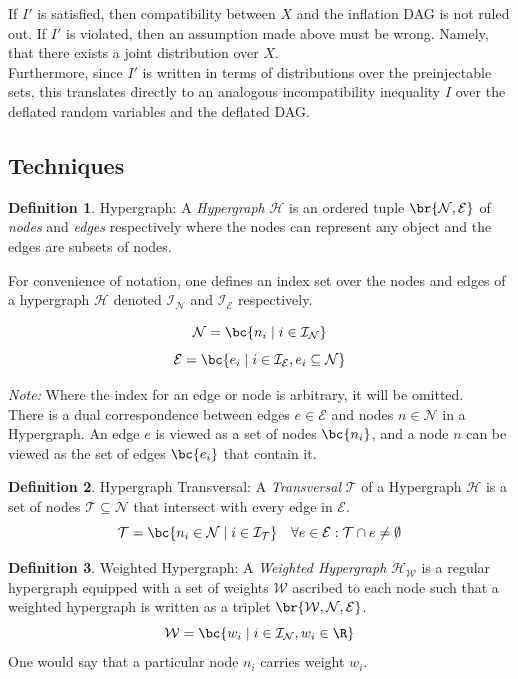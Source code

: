 \documentclass{article}
\theoremstyle{definition}
\newtheorem{definition}{Definition}[section]
\newcommand{\hgraph}{\mathcal{H}}
\newcommand{\nodes}{\mathcal{N}}
\newcommand{\weights}{\mathcal{W}}
\newcommand{\edges}{\mathcal{E}}
\newcommand{\trans}{\mathcal{T}}
\newcommand{\ind}{\mathcal{I}}
\begin{document}
    If $I'$ is satisfied, then compatibility between $X$ and the inflation DAG is not ruled out. If $I'$ is violated, then an assumption made above must be wrong. Namely, that there exists a joint distribution over $X$. \\

    Furthermore, since $I'$ is written in terms of distributions over the preinjectable sets, this translates directly to an analogous incompatibility inequality $I$ over the deflated random variables and the deflated DAG. \\

    \subsection*{Techniques}


    \begin{definition}{Hypergraph:}
        A \textit{Hypergraph} $\hgraph$ is an ordered tuple $\br{\nodes, \edges}$ of \textit{nodes} and \textit{edges} respectively where the nodes can represent any object and the edges are subsets of nodes.

        For convenience of notation, one defines an index set over the nodes and edges of a hypergraph $\hgraph$ denoted $\ind_\nodes$ and $\ind_\edges$ respectively.

        \[ \nodes = \bc{n_i \mid i \in \ind_\nodes} \]
        \[ \edges = \bc{e_i \mid i \in \ind_\edges, e_i \subseteq \nodes} \]

        \textit{Note:} Where the index for an edge or node is arbitrary, it will be omitted. \\

        There is a dual correspondence between edges $e \in \edges$ and nodes $n \in \nodes$ in a Hypergraph. An edge $e$ is viewed as a set of nodes $\bc{n_i}$, and a node $n$ can be viewed as the set of edges $\bc{e_i}$ that contain it.
    \end{definition}

    \begin{definition}{Hypergraph Transversal:}
        A \textit{Transversal} $\trans$ of a Hypergraph $\hgraph$ is a set of nodes $\trans \subseteq \nodes$ that intersect with every edge in $\edges$.
        \[ \trans = \bc{n_i \in \nodes \mid i \in \ind_\trans } \quad \forall e \in \edges : \trans \cap e \neq \emptyset \]
    \end{definition}

    \begin{definition}{Weighted Hypergraph:}
        A \textit{Weighted Hypergraph} $\hgraph_\weights$ is a regular hypergraph equipped with a set of weights $\weights$ ascribed to each node such that a weighted hypergraph is written as a triplet $\br{\weights, \nodes, \edges}$.
        \[ \weights = \bc{w_i \mid i \in \ind_\nodes, w_i \in \R} \]
        One would say that a particular node $n_i$ carries weight $w_i$.
    \end{definition}
\end{document}
